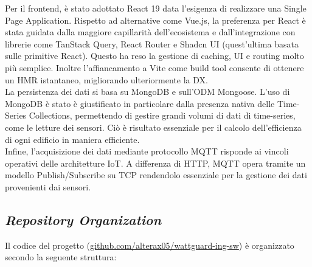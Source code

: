 Per il frontend, è stato adottato React 19 data l'esigenza di realizzare una Single Page Application. Rispetto ad alternative come Vue.js, la preferenza per React è stata guidata dalla maggiore capillarità dell'ecosistema e dall'integrazione con librerie come TanStack Query, React Router e Shadcn UI (quest'ultima basata sulle primitive React). Questo ha reso la gestione di caching, UI e routing molto più semplice. Inoltre l'affiancamento a Vite come build tool consente di ottenere un HMR istantaneo, migliorando ulteriormente la DX.\\

La persistenza dei dati si basa su MongoDB e sull'ODM Mongoose. 
L'uso di MongoDB è stato è giustificato in particolare dalla presenza nativa delle Time-Series Collections, permettendo di gestire grandi volumi di dati di time-series, come le letture dei sensori. Ciò è risultato essenziale per il calcolo dell'efficienza di ogni edificio in maniera efficiente.
\\
Infine, l'acquisizione dei dati mediante protocollo MQTT risponde ai vincoli operativi delle architetture IoT. A differenza di HTTP, MQTT opera tramite un modello Publish/Subscribe su TCP rendendolo essenziale per la gestione dei dati provenienti dai sensori.

\subsection{\textit{Repository Organization}}
Il codice del progetto (\href{https://github.com/alterax05/wattguard-ing-sw}{github.com/alterax05/wattguard-ing-sw}) è organizzato secondo la seguente struttura:

